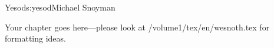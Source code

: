 \begin{aosachapter}{Yesod}{s:yesod}{Michael Snoyman}

Your chapter goes here---please look at /volume1/tex/en/wesnoth.tex for 
formatting ideas.

\end{aosachapter}
